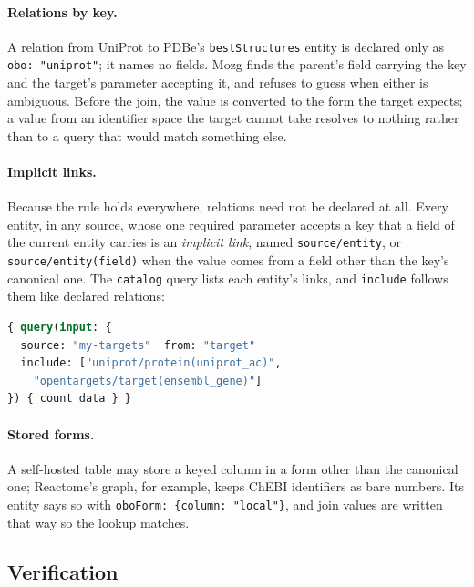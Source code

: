 \documentclass[sigconf,nonacm]{acmart}
\begin{document}
\paragraph{Relations by key.}
A relation from UniProt to PDBe's \texttt{bestStructures} entity is
declared only as \texttt{obo:~"uniprot"}; it names no fields.  Mozg
finds the parent's field carrying the key and the target's parameter
accepting it, and refuses to guess when either is ambiguous.  Before the join, the value
is converted to the form the target expects; a value from an identifier
space the target cannot take resolves to nothing rather than to a query
that would match something else.

\paragraph{Implicit links.}
Because the rule holds everywhere, relations need not be declared at
all.  Every entity, in any source, whose one required parameter accepts
a key that a field of the current entity carries is an \emph{implicit
link}, named \texttt{source/entity}, or \texttt{source/entity(field)}
when the value comes from a field other than the key's canonical one.
The \texttt{catalog} query lists each entity's links, and
\texttt{include} follows them like declared relations:

\begin{lstlisting}[language=GraphQL,caption={Rows of a self-hosted database joined to two public sources by OBO key, with no relation declared.},label={lst:implicit}]
{ query(input: {
  source: "my-targets"  from: "target"
  include: ["uniprot/protein(uniprot_ac)",
    "opentargets/target(ensembl_gene)"]
}) { count data } }
\end{lstlisting}

\paragraph{Stored forms.}
A self-hosted table may store a keyed column in a form other than the
canonical one; Reactome's graph, for example, keeps ChEBI identifiers
as bare numbers.  Its entity says so with
\texttt{oboForm: \{column: "local"\}}, and join values are written that
way so the lookup matches.

\subsection{Verification}
\label{sec:verification}
\end{document}
